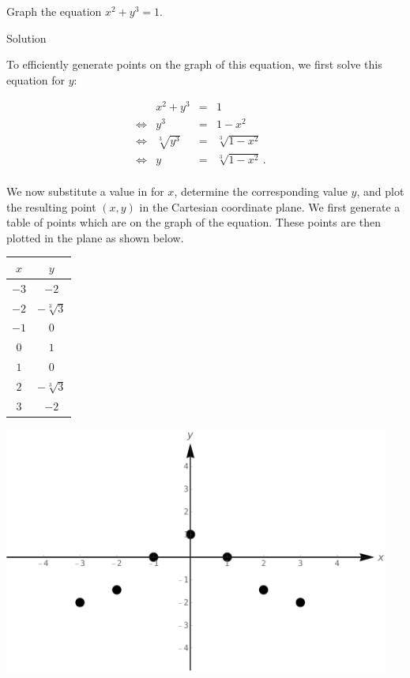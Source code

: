 \begin{example}
\label{examplerelation}
Graph the equation $x^2 + y^3 = 1$.

Solution 

To  efficiently generate points on the graph of this equation, we first solve this equation for $y$:

\allowdisplaybreaks
\[ \begin{array}{rrclr} 
&    x^2 + y^3 & = & 1 & \\ 
\Leftrightarrow &          y^3 & = & 1 - x^2 & \\
\Leftrightarrow &\sqrt[3]{y^3} & = & \sqrt[3]{1 - x^2} & \\
\Leftrightarrow &            y & = & \sqrt[3]{1 - x^2}\,. & \\ 
            \end{array} \]

We now substitute a value in for $x$, determine the corresponding value $y$, and plot the resulting point $(x,y)$ in the Cartesian coordinate plane. We first generate a table of points which are on the graph of the equation.  These points are then plotted in the plane as shown below.

\begin{minipage}[c]{0.45\textwidth}
\begin{center}
\renewcommand{\arraystretch}{1.5}%
\begin{tabular}{c|c}  
	$x$&$y$ \\ \hline\hline
	$-3$&$ -2$ \\  
	$-2$&$-\sqrt[3]{3}$ \\  
	$ -1$&$ 0$ \\  
	$ 0 $&$ 1$ \\  
	$ 1$&$ 0$ \\  
	$2$&$-\sqrt[3]{3}$ \\  
	$3$&$ -2$ \\  
\end{tabular}
\end{center}
\end{minipage}
\begin{minipage}[c]{0.45\textwidth}
	\begin{center}
			\includegraphics[width=0.95\textwidth]{fig_functions_4}
	\end{center}
\end{minipage}


\end{example}
